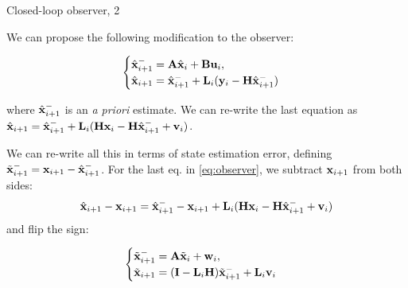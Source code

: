 \documentclass{beamer}
\begin{document}
\begin{frame}{Closed-loop observer, 2}
	\begin{flushleft}
		
		
		We can propose the following modification to the observer:
		
		\begin{equation}
			\label{eq:observer}
			\begin{cases}
				\hat{\mathbf{x}}_{i+1}^- = \mathbf{A} \hat{\mathbf{x}}_i + \mathbf{B} \mathbf{u}_i, \\
				\hat{\mathbf{x}}_{i+1} = \hat{\mathbf{x}}_{i+1}^- + \mathbf{L}_i (\mathbf{y}_i - \mathbf{H} \hat{\mathbf{x}}_{i+1}^-)
			\end{cases}
		\end{equation}
		
		where $\hat{\mathbf{x}}_{i+1}^-$ is an \emph{a priori} estimate. \textcolor{mygray2}{We can re-write the last equation as 
			$\hat{\mathbf{x}}_{i+1} = \hat{\mathbf{x}}_{i+1}^- + \mathbf{L}_i (\mathbf{H} \mathbf{x}_i - \mathbf{H} \hat{\mathbf{x}}_{i+1}^- + \mathbf{v}_i) $.} 
		
		\bigskip
		
		We can re-write all this in terms of state estimation error, defining $\Tilde{\mathbf{x}}_{i+1}^- = \mathbf{x}_{i+1} - \hat{\mathbf{x}}_{i+1}^-$. For the last eq. in \eqref{eq:observer}, we subtract $\mathbf{x}_{i+1}$ from both sides:
		\begin{equation}
		\hat{\mathbf{x}}_{i+1}-\mathbf{x}_{i+1} = \hat{\mathbf{x}}_{i+1}^- - \mathbf{x}_{i+1} + 
		\mathbf{L}_i (\mathbf{H} \mathbf{x}_i - \mathbf{H} \hat{\mathbf{x}}_{i+1}^- + \mathbf{v}_i) 
		\end{equation}				
		 and flip the sign:
		
		\begin{equation}
	\begin{cases}
		\Tilde{\mathbf{x}}_{i+1}^- = \mathbf{A} \Tilde{\mathbf{x}}_i + \mathbf{w}_i, \\
		\Tilde{\mathbf{x}}_{i+1} = (\mathbf{I} - \mathbf{L}_i \mathbf{H}) \Tilde{\mathbf{x}}_{i+1}^- + \mathbf{L}_i\mathbf{v}_i
	\end{cases}
		\end{equation}		
	
		
		
	\end{flushleft}
\end{frame}
\end{document}
